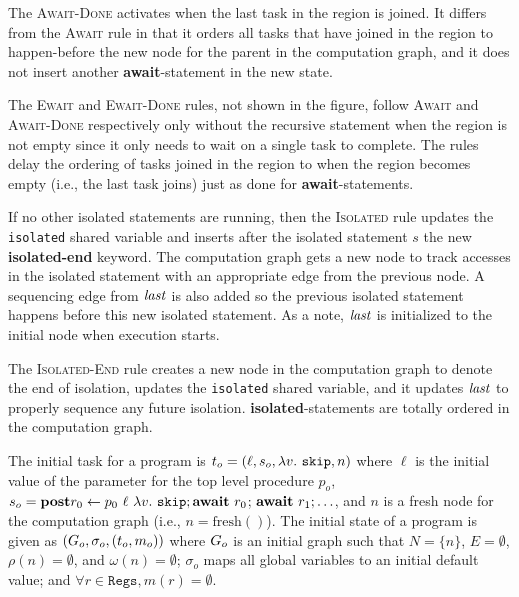 The \textsc{Await-Done} activates when the last task in the region is
joined. It differs from the \textsc{Await} rule in that it
orders all tasks that have joined in the region to happen-before the
new node for the parent in the computation graph, and it does not
insert another \textbf{await}-statement in the new state.

The \textsc{Ewait} and \textsc{Ewait-Done} rules, not shown in the
figure, follow \textsc{Await} and \textsc{Await-Done} respectively
only without the recursive statement when the region is not empty
since it only needs to wait on a single task to complete. The rules
delay the ordering of tasks joined in the region to when the region
becomes empty (i.e., the last task joins) just as done for
\textbf{await}-statements.

If no other isolated statements are running, then the
\textsc{Isolated} rule updates the \texttt{isolated} shared variable
and inserts after the isolated statement $\mathit{s}$ the new
\textbf{isolated-end} keyword. The computation graph gets a new node
to track accesses in the isolated statement with an appropriate edge
from the previous node. A sequencing edge from $\mathit{last}$ is also added
so the previous isolated statement happens before this new isolated
statement. As a note, $\mathit{last}$ is initialized to the initial node when
execution starts.

The \textsc{Isolated-End} rule creates a new node in the computation
graph to denote the end of isolation, updates the \texttt{isolated}
shared variable, and it updates $\mathit{last}$ to properly sequence any
future isolation. \textbf{isolated}-statements are totally ordered in
the computation graph.

The initial task for a program is $t_o = \left( \ell, s_o,
  \lambda v.~\mathtt{skip}, n \right)$ where $\ell$ is the initial value of
the parameter for the top level procedure $p_o$, $s_o = \mathbf{post} r_0
\leftarrow p_0~\ell~\lambda v.~\mathtt{skip}; \mathbf{await}~r_0$;
$\mathbf{await}~r_1; \ldots$, and $n$ is a fresh node for the computation
graph (i.e., $n = \mathrm{fresh}()$). The initial state of a program
is given as $\left( G_o, \sigma_o, \left( t_o,m_o \right) \right)$ where $G_o$
is an initial graph such that $N = \{n\}$, $E = \emptyset$, $\rho(n) =
\emptyset$, and $\omega(n) = \emptyset$; $\sigma_o$ maps all global
variables to an initial default value; and $\forall r \in
\texttt{Regs}, m(r) = \emptyset$.

